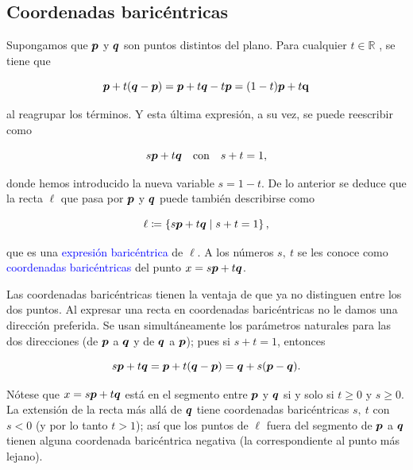 \documentclass{article}
\theoremstyle{definicion}
\theoremstyle{definition}             %
\theoremstyle{definition}             %
\theoremstyle{definition}
\theoremstyle{definition}
\theoremstyle{observacion}
\theoremstyle{definition}
\theoremstyle{plain}
\theoremstyle{definition}
\theoremstyle{afirmacion}
\theoremstyle{notation}
\theoremstyle{definition}
\begin{document}
    \subsection{Coordenadas baricéntricas}

    Supongamos que \(\vb*{p}\) y \(\vb*{q}\) son puntos distintos del plano. Para cualquier \(t \in \mathbb{R}\) , se tiene que

    \begin{equation*}
        \vb*{p} + t(\vb*{q} - \vb*{p}) = \vb*{p} + t\vb*{q} - t\vb*{p} = (1 - t)\vb*{p} + t\vb{q}
    \end{equation*}

    al reagrupar los términos. Y esta última expresión, a su vez, se puede reescribir como 

    \begin{equation*}
        s\vb*{p} + t\vb*{q}\quad \text{con} \quad s + t = 1,
    \end{equation*}

    donde hemos introducido la nueva variable \(s = 1 - t\). De lo anterior se deduce que la recta \(\ell\) que pasa por \(\vb*{p}\) y \(\vb*{q}\) puede también describirse como 

    \begin{equation*}
        \ell \coloneq \left\lbrace s\vb*{p} + t\vb*{q} \mid s + t = 1\right\rbrace,
    \end{equation*}

    que es una \textcolor{blue}{expresión baricéntrica} de \(\ell\). A los números \(s,\ t\) se les conoce como \textcolor{blue}{coordenadas baricéntricas} del punto \(x = s\vb*{p} + t\vb*{q}\).

    Las coordenadas baricéntricas tienen la ventaja de que ya no distinguen entre los dos puntos. Al expresar una recta en coordenadas baricéntricas no le damos una dirección preferida. Se usan simultáneamente los parámetros naturales para las dos direcciones (de \(\vb*{p}\) a \(\vb*{q}\) y de \(\vb*{q}\) a \(\vb*{p}\)); pues si \(s + t = 1\), entonces

    \begin{equation*}
        s\vb*{p} + t\vb*{q} = \vb*{p} + t(\vb*{q} - \vb*{p}) = \vb*{q} + s(\vb*{p} - \vb*{q}).
    \end{equation*}

    Nótese que \(x = s\vb*{p} + t\vb*{q}\) está en el segmento entre \(\vb*{p}\) y \(\vb*{q}\) si y solo si \(t \geq 0\) y \(s \geq 0\). La extensión de la recta más allá de \(\vb*{q}\) tiene coordenadas baricéntricas \(s,\ t\) con \(s < 0\) (y por lo tanto \(t > 1\)); así que los puntos de \(\ell\) fuera del segmento de \(\vb*{p}\) a \(\vb*{q}\) tienen alguna coordenada baricéntrica negativa (la correspondiente al punto más lejano).
\end{document}

